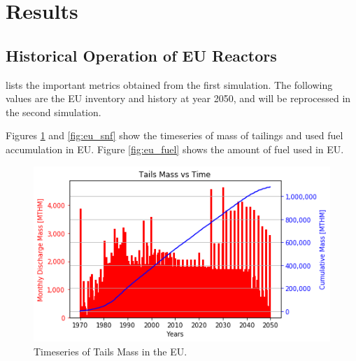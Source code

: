 \section{Results}

\subsection{Historical Operation of \gls{EU} Reactors}

 lists the important metrics
obtained from the first simulation. The following
values are the \gls{EU} inventory and history at year 2050,
and will be reprocessed in the second simulation.

\begin{table}[h]
	\centering
	\caption{Simulation Results for Historical Nuclear Operation of \gls{EU} Nations}
	\label{tab:sim_result}
	\end {table}
	\FloatBarrier
	
	
	Figures \ref{fig:eu_tail} and \ref{fig:eu_snf} show the 
	timeseries of mass of tailings and used fuel accumulation in \gls{EU}.
	Figure \ref{fig:eu_fuel} shows the amount of fuel used in \gls{EU}.
	
	
	\begin{figure}[htbp!]
		\begin{center}
			\includegraphics[width=\columnwidth]{./images/eu_future/tails.png}
		\end{center}
		\caption{Timeseries of Tails Mass in the \gls{EU}.}
		\label{fig:eu_tail}
	\end{figure}
	
